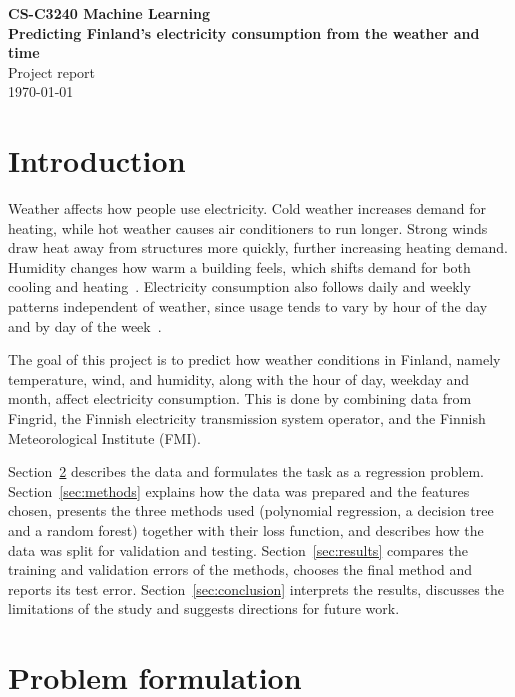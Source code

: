 \documentclass[10pt,a4paper]{article}
\newcommand{\ReportTitle}{Predicting Finland's electricity consumption from the weather and time}
\begin{document}
\begin{center}
  {\large\bfseries CS-C3240 Machine Learning}\\[0.4em]
  {\large\bfseries \ReportTitle}\\[0.4em]
  {\large Project report}\\[0.4em]
  {\today}
\end{center}

\section{Introduction}

Weather affects how people use electricity. Cold weather increases demand for heating,
while hot weather causes air conditioners to run longer. Strong winds draw heat away
from structures more quickly, further increasing heating demand. Humidity changes how
warm a building feels, which shifts demand for both cooling and
heating~\cite{montel2024weather}. Electricity consumption also follows daily and weekly
patterns independent of weather, since usage tends to vary by hour of the day and by day
of the week~\cite{eia2011demand}.

The goal of this project is to predict how weather conditions in Finland, namely
temperature, wind, and humidity, along with the hour of day, weekday and month, affect
electricity consumption. This is done by combining data from Fingrid, the Finnish
electricity transmission system operator, and the Finnish Meteorological Institute (FMI).

Section~\ref{sec:problem} describes the data and formulates the task as a regression
problem. Section~\ref{sec:methods} explains how the data was prepared and the features
chosen, presents the three methods used (polynomial regression, a decision tree and a
random forest) together with their loss function, and describes how the data was split
for validation and testing. Section~\ref{sec:results} compares the training and validation
errors of the methods, chooses the final method and reports its test error.
Section~\ref{sec:conclusion} interprets the results, discusses the limitations of the study
and suggests directions for future work.

\section{Problem formulation}
\label{sec:problem}
\end{document}
